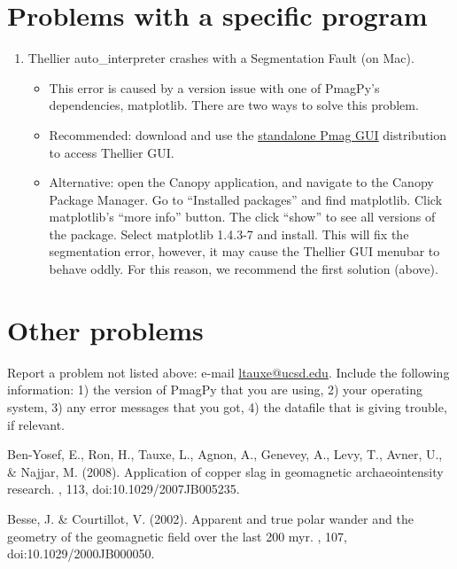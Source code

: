 \documentclass[11pt]{book}
\begin{document}
{{{{\section{Problems with a specific program}
\begin{enumerate}
\item Thellier auto\_interpreter crashes with a Segmentation Fault (on Mac).
  \begin{itemize}
  \item This error is caused by a version issue with one of PmagPy's dependencies, matplotlib.  There are two ways to solve this problem.
  \item Recommended: download and use the \href{#standalone}{standalone Pmag GUI} distribution to access Thellier GUI.
  \item Alternative: open the Canopy application, and navigate to the Canopy Package Manager.  Go to ``Installed packages'' and find matplotlib.  Click matplotlib's ``more info'' button.  The click ``show'' to see all versions of the package.  Select matplotlib 1.4.3-7 and install.  This will fix the segmentation error, however, it may cause the Thellier GUI menubar to behave oddly.  For this reason, we recommend the first solution (above).
  \end{itemize}
\end{enumerate}

\section{Other problems}Report a problem not listed above: e-mail \href{mailto:ltauxe@ucsd.edu}{ltauxe@ucsd.edu}. Include the following information: 1) the version of PmagPy that you are using, 2) your operating system, 3) any error messages that you got, 4) the datafile that is giving trouble, if relevant.




\begin{thebibliography}{}

Ben-Yosef, E., Ron, H., Tauxe, L., Agnon, A., Genevey, A., Levy, T., Avner, U.,
  \& Najjar, M. (2008).
\newblock Application of copper slag in geomagnetic archaeointensity research.
, 113, doi:10.1029/2007JB005235.

Besse, J. \& Courtillot, V. (2002).
\newblock Apparent and true polar wander and the geometry of the geomagnetic
  field over the last 200 myr.
, 107, doi:10.1029/2000JB000050.


\end{thebibliography}}}}}
\end{document}
